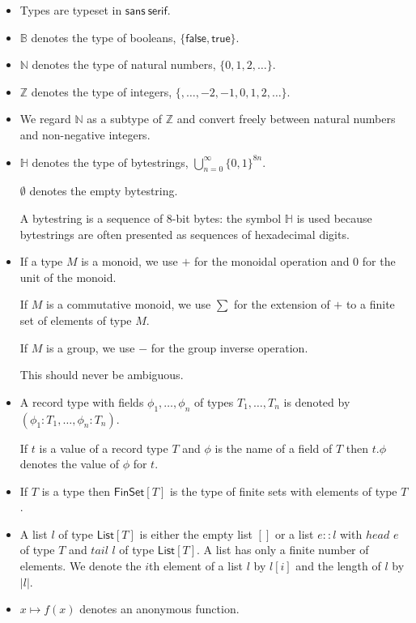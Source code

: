 \documentclass[a4paper]{article}
\newcounter{note}
\newcommand{\s}{\textsf}  %
\newcommand{\true}{\textsf{true}}
\newcommand{\false}{\textsf{false}}
\newcommand{\List}[1]{\ensuremath{\s{List}[#1]}}
\newcommand{\FinSet}[1]{\ensuremath{\s{FinSet}[#1]}}
\newcommand\B{\ensuremath{\mathbb{B}}}
\newcommand\N{\ensuremath{\mathbb{N}}}
\newcommand\Z{\ensuremath{\mathbb{Z}}}
\renewcommand\H{\ensuremath{\mathbb{H}}}
\newcommand{\emptyBs}{\ensuremath{\emptyset}}
\begin{document}
\begin{itemize}
\item Types are typeset in $\mathsf{sans~serif}$.

\item \B{} denotes the type of booleans, $\{\false, \true\}$.
\item \N{} denotes the type of natural numbers, $\{0, 1, 2, \ldots\}$.
\item \Z{} denotes the type of integers, $\{,\ldots, -2, -1, 0, 1, 2, \ldots\}$.
\item We regard $\N$ as a subtype of $\Z$ and convert freely between
  natural numbers and non-negative integers.
\item \H{} denotes the type of bytestrings,
  $\bigcup_{n=0}^{\infty}\{0,1\}^{8n}$.

  \emptyBs{} denotes the empty bytestring.

  A bytestring is a sequence of 8-bit bytes: the symbol $\H$ is used because bytestrings are often
  presented as sequences of hexadecimal digits.

\item If a type $M$ is a monoid, we use $+$ for the monoidal operation and $0$
  for the unit of the monoid.

  If $M$ is a commutative monoid, we use $\sum$ for the extension of $+$ to a finite set of elements of
  type $M$.

  If $M$ is a group, we use $-$ for the group
  inverse operation.

  This should never be ambiguous.

\item A record type with fields $\phi_1, \ldots, \phi_n$ of types $T_1,
  \ldots, T_n$ is denoted by $(\phi_1 : T_1, \ldots, \phi_n : T_n)$.

  If $t$ is a value of a record type $T$ and $\phi$ is the name
  of a field of $T$ then $t.\phi$ denotes the value of $\phi$ for
  $t$.

\item If $T$ is a type then $\FinSet{T}$ is the type of finite sets
  with elements of type $T$.

\item A list $l$ of type $\List{T}$ is either the empty list
  $[]$ or a list $e :: l$ with $head$ $e$ of type $T$ and
  $tail$ $l$ of type $\List{T}$. A list has only a finite
  number of elements.  We denote the $i$th element of a list $l$ by
  $l[i]$ and the length of $l$ by $\left|l\right|$.

\item $x \mapsto f(x)$ denotes an anonymous function.


\end{itemize}
\end{document}
